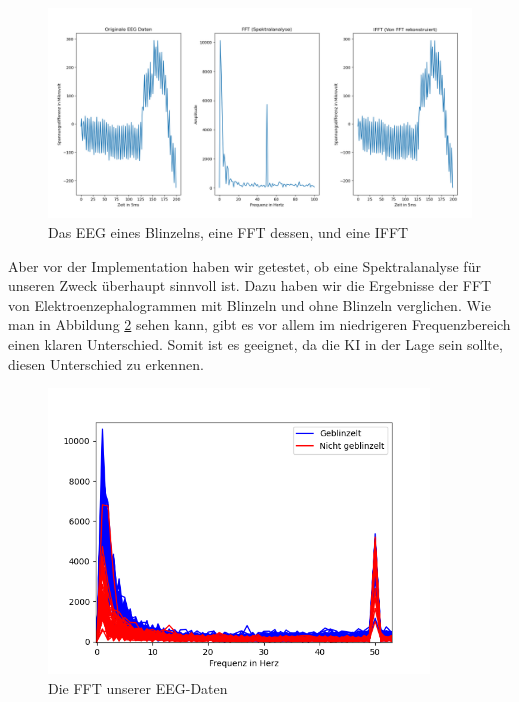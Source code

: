 \documentclass{scrartcl}
\begin{document}
	\begin{figure}[h!]
		\includegraphics[width=\textwidth]{pictures/blink_fft_ifft.png}
		\caption{Das EEG eines Blinzelns, eine FFT dessen, und eine IFFT}
		\label{EEG-IFFT}
	\end{figure}

	Aber vor der Implementation haben wir getestet, ob eine Spektralanalyse für unseren Zweck überhaupt sinnvoll ist. Dazu haben wir die Ergebnisse der FFT von Elektroenzephalogrammen mit Blinzeln und ohne Blinzeln verglichen. Wie man in Abbildung \ref{EEG-FFT} sehen kann, gibt es vor allem im niedrigeren Frequenzbereich einen klaren Unterschied. %
	Somit ist es geeignet, da die KI in der Lage sein sollte, diesen Unterschied zu erkennen.

	\begin{figure}[H]
		\includegraphics[width=0.9\textwidth]{pictures/Die_FFTs_der_EEG-Daten.png}
		\caption{Die FFT unserer EEG-Daten}
		\label{EEG-FFT}
	\end{figure}
	
\end{document}
